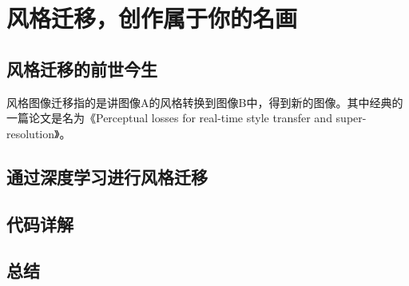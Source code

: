 \chapter{风格迁移，创作属于你的名画}

\section{风格迁移的前世今生}
风格图像迁移指的是讲图像A的风格转换到图像B中，得到新的图像。其中经典的一篇论文是名为《Perceptual losses for real-time style transfer and super-resolution》\cite{johnson2016perceptual}。

\section{通过深度学习进行风格迁移}


\section{代码详解}


\section{总结}



